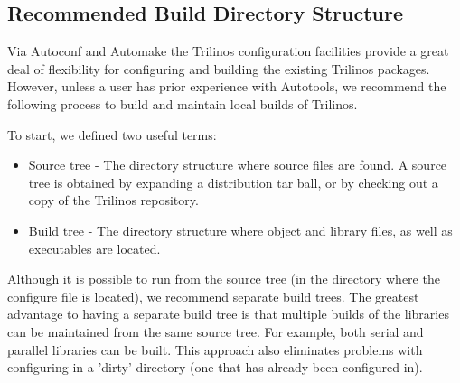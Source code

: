 \subsection{Recommended Build Directory Structure}

Via Autoconf and Automake the Trilinos configuration facilities
provide a great deal of flexibility for configuring and building the
existing Trilinos packages.  However, unless a user has prior experience
with Autotools, we recommend the following process to build and
maintain local builds of Trilinos.

To start, we defined two useful terms:
\begin{itemize}
\item Source tree - The directory structure where source files are found.  A source 
tree is obtained by expanding a distribution tar ball, or by checking 
out a copy of the Trilinos repository.  
\item Build tree - The directory structure where object and library files, as well 
as executables are located.  
\end{itemize}
 
\begin{minipage}[c]{\textwidth}

\begin{minipage}[l]{.6\textwidth}

Although it is possible to run  from the source tree (in 
the directory where the configure file is located), we recommend 
separate build trees.  The greatest advantage to having a separate 
build tree is that multiple builds of the libraries can be maintained
from the same source tree.  For example, both serial and parallel libraries
can be built.  
This approach also eliminates problems with configuring in a 'dirty'
directory (one that has already been configured in).
\end{minipage}\hfill
{}
\end{minipage}

